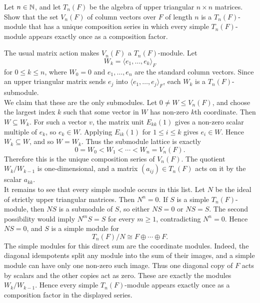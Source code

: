 \documentclass[../Odyssey_Project.tex]{subfiles}
\begin{document}
\begin{exercise}
\label{ex:13.3}
Let $n \in \mathbb{N}$, and let $T_n(F)$ be the algebra of upper triangular $n \times n$ matrices. Show that the set $V_n(F)$ of column vectors over $F$ of length $n$ is a $T_n(F)$-module that has a unique composition series in which every simple $T_n(F)$-module appears exactly once as a composition factor.
\end{exercise}
\begin{solution}
    The usual matrix action makes $V_n(F)$ a $T_n(F)$-module. Let
    \[
        W_k=\langle e_1,\ldots,e_k\rangle_F
    \]
    for $0\leq k\leq n$, where $W_0=0$ and $e_1,\ldots,e_n$ are the standard column vectors. Since an upper triangular matrix sends $e_j$ into $\langle e_1,\ldots,e_j\rangle_F$, each $W_k$ is a $T_n(F)$-submodule.\\
    We claim that these are the only submodules. Let $0\neq W\leq V_n(F)$, and choose the largest index $k$ such that some vector in $W$ has non-zero $k$th coordinate. Then $W\subseteq W_k$. For such a vector $v$, the matrix unit $E_{kk}(1)$ gives a non-zero scalar multiple of $e_k$, so $e_k\in W$. Applying $E_{ik}(1)$ for $1\leq i\leq k$ gives $e_i\in W$. Hence $W_k\subseteq W$, and so $W=W_k$. Thus the submodule lattice is exactly
    \[
        0=W_0<W_1<\cdots<W_n=V_n(F).
    \]
    Therefore this is the unique composition series of $V_n(F)$. The quotient $W_k/W_{k-1}$ is one-dimensional, and a matrix $(a_{ij})\in T_n(F)$ acts on it by the scalar $a_{kk}$.\\
    It remains to see that every simple module occurs in this list. Let $N$ be the ideal of strictly upper triangular matrices. Then $N^n=0$. If $S$ is a simple $T_n(F)$-module, then $NS$ is a submodule of $S$, so either $NS=0$ or $NS=S$. The second possibility would imply $N^mS=S$ for every $m\geq1$, contradicting $N^n=0$. Hence $NS=0$, and $S$ is a simple module for
    \[
        T_n(F)/N\cong F\oplus\cdots\oplus F.
    \]
    The simple modules for this direct sum are the coordinate modules. Indeed, the diagonal idempotents split any module into the sum of their images, and a simple module can have only one non-zero such image. Thus one diagonal copy of $F$ acts by scalars and the other copies act as zero. These are exactly the modules $W_k/W_{k-1}$. Hence every simple $T_n(F)$-module appears exactly once as a composition factor in the displayed series.
\end{solution}
\end{document}
